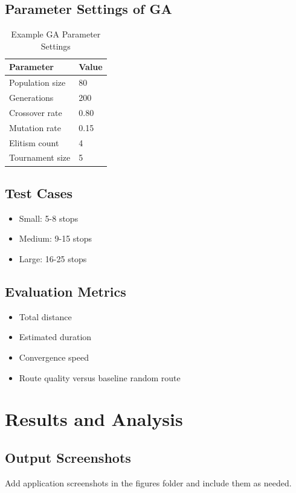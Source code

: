 \documentclass[12pt,a4paper]{report}
\begin{document}
\section{Parameter Settings of GA}
\begin{table}[H]
\centering
\caption{Example GA Parameter Settings}
\label{tab:ga-params}
\begin{tabular}{ll}
\toprule
Parameter & Value \\
\midrule
Population size & 80 \\
Generations & 200 \\
Crossover rate & 0.80 \\
Mutation rate & 0.15 \\
Elitism count & 4 \\
Tournament size & 5 \\
\bottomrule
\end{tabular}
\end{table}

\section{Test Cases}
\begin{itemize}
    \item Small: 5-8 stops
    \item Medium: 9-15 stops
    \item Large: 16-25 stops
\end{itemize}

\section{Evaluation Metrics}
\begin{itemize}
    \item Total distance
    \item Estimated duration
    \item Convergence speed
    \item Route quality versus baseline random route
\end{itemize}

\chapter{Results and Analysis}

\section{Output Screenshots}
Add application screenshots in the figures folder and include them as needed.
\end{document}
